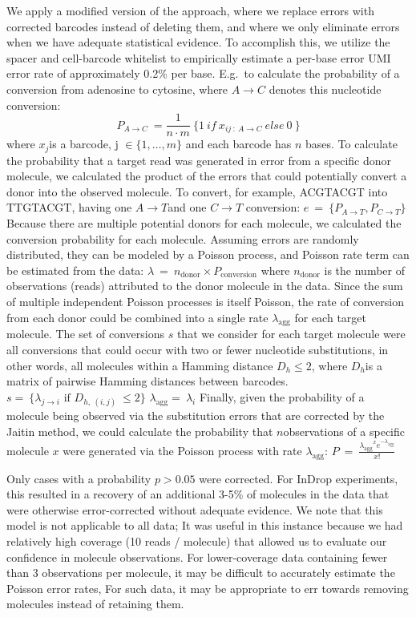 We apply a modified version of the \citep{Jaitin2014} approach, where we replace errors with corrected barcodes instead of deleting them, and where we only eliminate errors when we have adequate statistical evidence. 
To accomplish this, we utilize the spacer and cell-barcode whitelist to empirically estimate a per-base error UMI error rate of approximately 0.2\% per base. 
E.g.\ to calculate the probability of a conversion from adenosine to cytosine, where \(A \rightarrow C\) denotes this nucleotide conversion:
\[P_{A \rightarrow C}\  = \frac{1}{n \cdot m}\ \{ 1\ if\ x_{ij\ :\ A \rightarrow C}\ else\ 0\ \}\]
where \(x_{j}\)is a barcode, \(\text{j\ } \in \{ 1,\ldots,m\}\) and each barcode has \(n\) bases.
To calculate the probability that a target read was generated in error from a specific donor molecule, we calculated the product of the errors that could potentially convert a donor into the observed molecule. 
To convert, for example, ACGTACGT into TTGTACGT, having one \(A \rightarrow T\)and one \(C \rightarrow T\) conversion:
\(e\  = \ \{ P_{A \rightarrow T},P_{C \rightarrow T}\}\ \)
Because there are multiple potential donors for each molecule, we calculated the conversion probability for each molecule. 
Assuming errors are randomly distributed, they can be modeled by a Poisson process, and Poisson rate term can be estimated from the data:
\(\lambda\  = \ n_{\text{donor}} \times P_{\text{conversion}}\)
where \(n_{\text{donor}}\) is the number of observations (reads) attributed to the donor molecule in the data. 
Since the sum of multiple independent Poisson processes is itself Poisson, the rate of conversion from each donor could be combined into a single rate \(\lambda_{\text{agg}}\) for each target molecule. 
The set of conversions \(s\) that we consider for each target molecule were all conversions that could occur with two or fewer nucleotide substitutions, in other words, all molecules within a Hamming distance \(D_{h} \leq 2\), where \(D_{h}\)is a matrix of pairwise Hamming distances between barcodes.
\(s = \ \{\lambda_{j \rightarrow i}\text{\ if\ }D_{h,\ (i,j)}\  \leq 2\}\)
\(\lambda_{\text{agg}} = \ \lambda_{i}\)
Finally, given the probability of a molecule being observed via the substitution errors that are corrected by the Jaitin method, we could calculate the probability that \(n\)observations of a specific molecule \(x\) were generated via the Poisson process with rate \(\lambda_{\text{agg}}\):
\(P\  = \ \frac{{\lambda_{\text{agg}}}^{x}e^{- \lambda_{\text{agg}}}}{x!}\)

Only cases with a probability $p > 0.05$ were corrected.  
For InDrop experiments, this resulted in a recovery of an additional 3-5\% of molecules in the data that were otherwise error-corrected without adequate evidence. 
We note that this model is not applicable to all data; It was useful in this instance because we had relatively high coverage (10 reads / molecule) that allowed us to evaluate our confidence in molecule observations. 
For lower-coverage data containing fewer than 3 observations per molecule, it may be difficult to accurately estimate the Poisson error rates, 
For such data, it may be appropriate to err towards removing molecules instead of retaining them.

